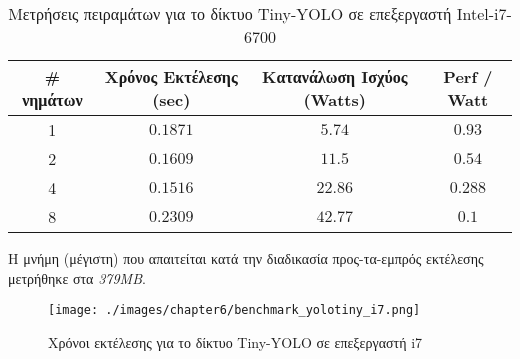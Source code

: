 \begin{table}[H]
  \begin{center}
    \caption{Μετρήσεις πειραμάτων για το δίκτυο Tiny-YOLO σε επεξεργαστή Intel-i7-6700}
    \label{tab:yolo_i7}
    \begin{tabular}{ | c | c | c | c | }
      \hline
      \rowcolor{Gray}
      \# νημάτων & Χρόνος Εκτέλεσης (sec) & Κατανάλωση Ισχύος (Watts) & Perf / Watt \\
      \hline
      1 & $0.1871$ & $5.74$ & $0.93$ \\
      2 & $0.1609$ & $11.5$ & $0.54$ \\
      4 & $0.1516$ & $22.86$ & $0.288$ \\
      8 & $0.2309$ & $42.77$ & $0.1$ \\
      \hline
    \end{tabular}
  \end{center}
\end{table}
Η μνήμη (μέγιστη) που απαιτείται κατά την διαδικασία
προς-τα-εμπρός εκτέλεσης μετρήθηκε στα \emph{379MB}.

\begin{figure}[H]
  \centering
  \texttt{[image: ./images/chapter6/benchmark\_yolotiny\_i7.png]}
  \caption[Χρόνoι εκτέλεσης για το δίκτυο Tiny-YOLO σε επεξεργαστή i7]{Χρόνοι εκτέλεσης για το δίκτυο Tiny-YOLO σε επεξεργαστή i7}
  \label{fig:yolotiny_results_i7}
\end{figure}


